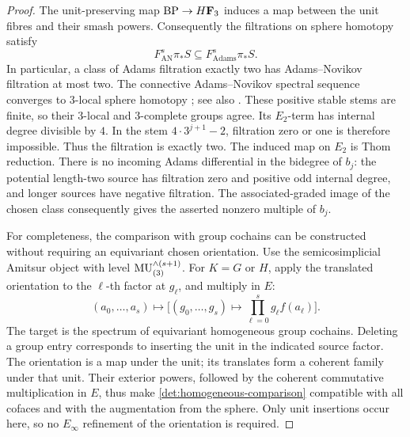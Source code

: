 \begin{proof}
The unit-preserving map \(\mathrm{BP}\to H\mathbf F_3\) induces a map between the
unit fibres and their smash powers.  Consequently the filtrations
on sphere homotopy satisfy
\begin{equation}\label{det:filtration-inclusion}
 F_{\mathrm{AN}}^s\pi_*S
 \subseteq F_{\mathrm{Adams}}^s\pi_*S .
\end{equation}
In particular, a class of Adams filtration exactly two has
Adams--Novikov filtration at most two.  The connective
Adams--Novikov spectral sequence converges to \(3\)-local sphere homotopy
\cite[Theorems~2.2.3 and~2.2.13--14]{Ravenel}; see also
\cite[p.~475, after Equation~(1.10)]{MRW}.
These positive stable stems are finite, so their \(3\)-local and
\(3\)-complete groups agree.  Its \(E_2\)-term
has internal degree divisible by \(4\).  In the stem
\(4\cdot3^{j+1}-2\), filtration zero or one is therefore impossible.
Thus the filtration is exactly two.
The induced map on \(E_2\) is Thom reduction.
There is no incoming Adams differential in the bidegree of \(b_j\):
the potential length-two source has filtration zero and positive
odd internal degree, and longer sources have negative filtration.
The associated-graded image of the chosen class consequently
gives the asserted nonzero multiple of \(b_j\).

For completeness, the comparison with group cochains can be
constructed without requiring an equivariant chosen orientation.
Use the semicosimplicial Amitsur object with level
\(\mathrm{MU}_{(3)}^{\wedge(s+1)}\).
For \(K=G\) or \(H\), apply the translated orientation to the
\(\ell\)-th factor at \(g_\ell\), and multiply in \(E\):
\begin{equation}\label{det:homogeneous-comparison}
 (a_0,\ldots,a_s)\longmapsto
 \bigl[(g_0,\ldots,g_s)\longmapsto
       \prod_{\ell=0}^s g_\ell f(a_\ell)\bigr].
\end{equation}
The target is the spectrum of equivariant homogeneous group
cochains.  Deleting a group entry corresponds to inserting the unit
in the indicated source factor.
The orientation is a map under the unit; its translates form a
coherent family under that unit.  Their exterior powers, followed
by the coherent commutative multiplication in \(E\), thus make
\eqref{det:homogeneous-comparison} compatible with all cofaces and
with the augmentation from the sphere.
Only unit insertions occur here, so no \(E_\infty\) refinement of
the orientation is required.


\end{proof}
